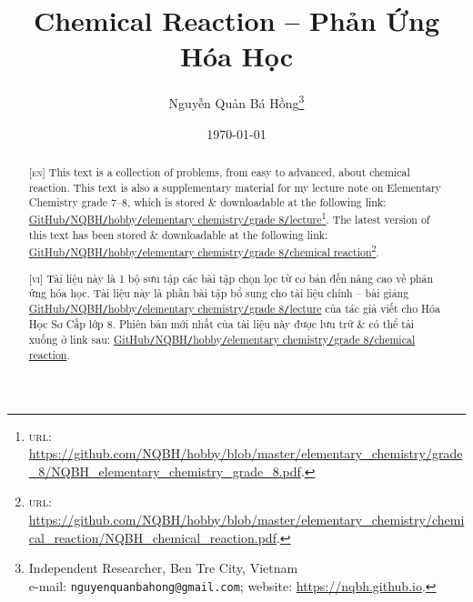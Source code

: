 \documentclass{article}
\title{Chemical Reaction -- Phản Ứng Hóa Học}
\author{Nguyễn Quản Bá Hồng\footnote{Independent Researcher, Ben Tre City, Vietnam\\e-mail: \texttt{nguyenquanbahong@gmail.com}; website: \url{https://nqbh.github.io}.}}
\date{\today}
\numberwithin{equation}{section}
\begin{document}
\maketitle
\begin{abstract}
	\textsc{[en]} This text is a collection of problems, from easy to advanced, about chemical reaction. This text is also a supplementary material for my lecture note on Elementary Chemistry grade 7--8, which is stored \& downloadable at the following link: \href{https://github.com/NQBH/hobby/blob/master/elementary_chemistry/grade_8/NQBH_elementary_chemistry_grade_8.pdf}{GitHub\texttt{/}NQBH\texttt{/}hobby\texttt{/}elementary chemistry\texttt{/}grade 8\texttt{/}lecture}\footnote{\textsc{url}: \url{https://github.com/NQBH/hobby/blob/master/elementary_chemistry/grade_8/NQBH_elementary_chemistry_grade_8.pdf}.}. The latest version of this text has been stored \& downloadable at the following link: \href{https://github.com/NQBH/hobby/blob/master/elementary_chemistry/chemical_reaction/NQBH_chemical_reaction.pdf}{GitHub\texttt{/}NQBH\texttt{/}hobby\texttt{/}elementary chemistry\texttt{/}grade 8\texttt{/}chemical reaction}\footnote{\textsc{url}: \url{https://github.com/NQBH/hobby/blob/master/elementary_chemistry/chemical_reaction/NQBH_chemical_reaction.pdf}.}.
	\vspace{2mm}
	
	\textsc{[vi]} Tài liệu này là 1 bộ sưu tập các bài tập chọn lọc từ cơ bản đến nâng cao về phản ứng hóa học. Tài liệu này là phần bài tập bổ sung cho tài liệu chính -- bài giảng \href{https://github.com/NQBH/hobby/blob/master/elementary_chemistry/grade_8/NQBH_elementary_chemistry_grade_8.pdf}{GitHub\texttt{/}NQBH\texttt{/}hobby\texttt{/}elementary chemistry\texttt{/}grade 8\texttt{/}lecture} của tác giả viết cho Hóa Học Sơ Cấp lớp 8. Phiên bản mới nhất của tài liệu này được lưu trữ \& có thể tải xuống ở link sau: \href{https://github.com/NQBH/hobby/blob/master/elementary_chemistry/grade_8/real/NQBH_real.pdf}{GitHub\texttt{/}NQBH\texttt{/}hobby\texttt{/}elementary chemistry\texttt{/}grade 8\texttt{/}chemical reaction}.
\end{abstract}
\setcounter{secnumdepth}{4}
\setcounter{tocdepth}{3}
\tableofcontents
\newpage

\end{document}
